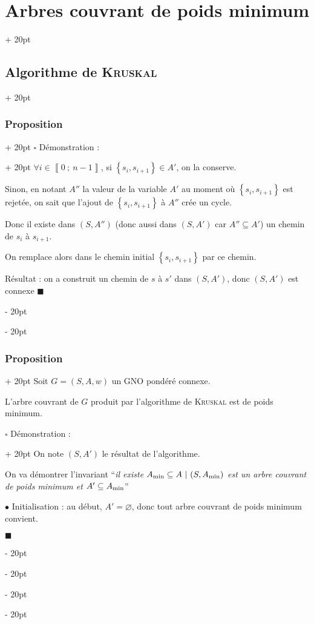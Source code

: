 \documentclass[a4paper, 12pt, twoside]{article}
\newcommand{\nset}[2]{\left\llbracket #1\ ;\ #2 \right\rrbracket}
\newcommand{\set}[1]{\left\{ #1 \right\}}
\newcommand{\ind}[1][20pt]{\advance\leftskip + #1}
\newcommand{\deind}[1][20pt]{\advance\leftskip - #1}
\newenvironment{indt}[2][20pt]{#2 \par \ind[#1]}{\par \deind} %
\newenvironment{proof}[1][{Démonstration :}]{\begin{indt}{$\square$ #1}}{$\blacksquare$ \end{indt}}
\begin{document}
\begin{indt}{\section{Arbres couvrant de poids minimum}}
\begin{indt}{\subsection{Algorithme de \textsc{Kruskal}}}
\begin{indt}{\subsubsection{Proposition}}
\begin{proof}
                    $\forall i \in \nset 0 {n - 1}$, si $\set{s_i, s_{i + 1}} \in A'$, on la conserve.

                    Sinon, en notant $A''$ la valeur de la variable $A'$ au moment où $\set{s_i, s_{i + 1}}$ est rejetée, on sait que l'ajout de $\set{s_i, s_{i + 1}}$ à $A''$ crée un cycle.

                    Donc il existe dans $(S, A'')$ (donc aussi dans $(S, A')$ car $A'' \subseteq A'$) un chemin de $s_i$ à $s_{i + 1}$.

                    On remplace alors dans le chemin initial $\set{s_i, s_{i + 1}}$ par ce chemin.

                    \vspace{6pt}
                    
                    Résultat : on a construit un chemin de $s$ à $s'$ dans $(S, A')$, donc $(S, A')$ est connexe
                \end{proof}
            \end{indt}

            \vspace{12pt}
            
            \begin{indt}{\subsubsection{Proposition}}
                Soit $G = (S, A, w)$ un GNO pondéré connexe.

                \begin{pseudocode}
                    L'arbre couvrant de $G$ produit par l'algorithme de \textsc{Kruskal} est de poids minimum.
                \end{pseudocode}

                \vspace{12pt}
                
                \begin{proof}
                    On note $(S, A')$ le résultat de l'algorithme.

                    On va démontrer l'invariant ``\textit{il existe $A_{\rm min} \subseteq A\ |\ (S, A_{\rm min})$ est un arbre couvrant de poids minimum et $A' \subseteq A_{\rm min}$}''

                    \vspace{6pt}
                    
                    $\bullet$ Initialisation : au début, $A' = \varnothing$, donc tout arbre couvrant de poids minimum convient.


\end{proof}
\end{indt}
\end{indt}
\end{indt}
\end{document}
